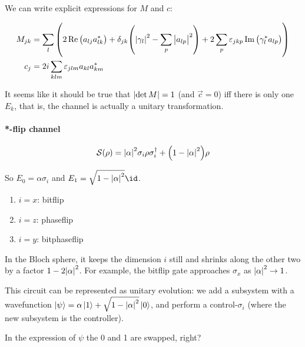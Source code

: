 \documentclass[main.tex]{subfiles}
\begin{document}
We can write explicit expressions for \(M\) and \(c\):

\begin{subequations}
\begin{align}
    M_{jk} &= \sum _{l} \qty(
    2 \Re \qty(a_{lj} a_{lk}^*)
    + \delta_{jk} \qty(
    \abs{\gamma_l}^2 - \sum _p \abs{a_{lp}}^2
    )
    + 2 \sum _p \varepsilon_{jkp} \Im \qty(
    \gamma_l ^* a_{lp}
    )
    )  \\
    c_j &= 2i \sum _{klm} \varepsilon_{jlm} a_{kl} a^* _{km}
\end{align}
\end{subequations}

It seems like it should be true that \(\abs{\det M} = 1 \) (and \(\vec{c} = 0\)) iff there is only one \(E_k\), that is, the channel is actually a unitary transformation.

\paragraph{*-flip channel}

\begin{equation}
    \mathcal S ( \rho) =
    \abs{\alpha}^2 \sigma_i \rho \sigma_i ^\dag + \qty(1 - \abs{\alpha}^2 ) \rho
\end{equation}

So \(E_0 = \alpha \sigma_i\) and \(E_1 = \sqrt{1 - \abs{\alpha}^2 } \id\).

\begin{enumerate}
    \item \(i=x\): bitflip
    \item \(i=z\): phaseflip
    \item \(i=y\): bitphaseflip
\end{enumerate}

In the Bloch sphere, it keeps the dimension \(i\) still and shrinks along the other two by a factor \(1- 2\abs{\alpha}^2 \). For example, the bitflip gate approaches \(\sigma_x\) as \(\abs{\alpha}^2  \rightarrow 1\).

This circuit can be represented as unitary evolution: we add a subsystem with a wavefunction \(\ket{\psi} = \alpha \ket{1} + \sqrt{1- \abs{\alpha}^2 } \ket{0} \), and perform a control-\(\sigma_i\) (where the new subsystem is the controller).

\begin{greenbox}
  In the expression of \(\psi\) the 0 and 1 are swapped, right?
\end{greenbox}
\end{document}
